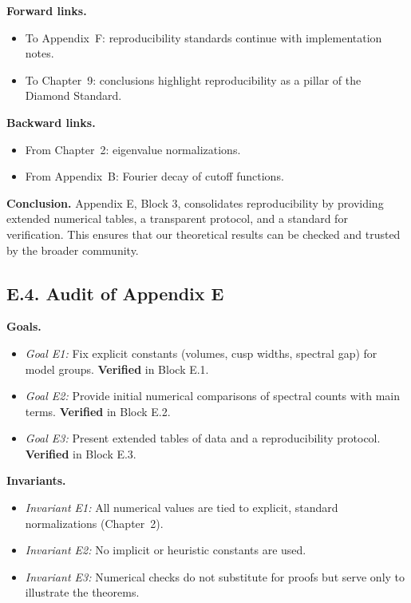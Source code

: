 \noindent \textbf{Forward links.}
\begin{itemize}
  \item To Appendix~F: reproducibility standards continue with implementation notes.
  \item To Chapter~9: conclusions highlight reproducibility as a pillar of the Diamond Standard.
\end{itemize}

\noindent \textbf{Backward links.}
\begin{itemize}
  \item From Chapter~2: eigenvalue normalizations.
  \item From Appendix~B: Fourier decay of cutoff functions.
\end{itemize}

\bigskip
\noindent \textbf{Conclusion.}
Appendix E, Block 3, consolidates reproducibility by providing extended numerical tables, a transparent protocol, and a standard for verification. This ensures that our theoretical results can be checked and trusted by the broader community.

\subsection*{E.4. Audit of Appendix E}

\noindent \textbf{Goals.}
\begin{itemize}
  \item \emph{Goal E1:} Fix explicit constants (volumes, cusp widths, spectral gap) for model groups. \textbf{Verified} in Block E.1.
  \item \emph{Goal E2:} Provide initial numerical comparisons of spectral counts with main terms. \textbf{Verified} in Block E.2.
  \item \emph{Goal E3:} Present extended tables of data and a reproducibility protocol. \textbf{Verified} in Block E.3.
\end{itemize}

\medskip
\noindent \textbf{Invariants.}
\begin{itemize}
  \item \emph{Invariant E1:} All numerical values are tied to explicit, standard normalizations (Chapter~2).
  \item \emph{Invariant E2:} No implicit or heuristic constants are used.
  \item \emph{Invariant E3:} Numerical checks do not substitute for proofs but serve only to illustrate the theorems.
\end{itemize}

